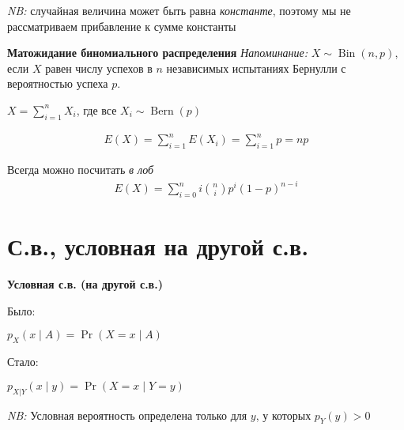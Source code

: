 \documentclass[12pt]{article}
\DeclareMathOperator{\Bin}{Bin}
\DeclareMathOperator{\Bern}{Bern}
\begin{document}
  \emph{NB:} случайная величина может быть равна \emph{константе}, поэтому мы не рассматриваем прибавление к сумме константы



  \textbf{Матожидание биномиального распределения}
  \emph{Напоминание:} $X \sim \Bin(n, p)$, если $X$ равен числу успехов в $n$ независимых испытаниях Бернулли с вероятностью успеха $p$.

   \vspace{1cm}

  $X = \sum_{i = 1}^n X_i$, где все $X_i \sim \Bern(p)$

  

  \begin{align*}
    E(X) = \sum_{i = 1}^n E(X_i) = \sum_{i = 1}^n p = np
  \end{align*}

  

  Всегда можно посчитать \emph{в лоб}
  \begin{align*}
    E(X) = \sum_{i = 0}^n i \binom{n}{i}p^i(1 - p)^{n - i}
  \end{align*}



\section{С.в., условная на другой с.в.}

  \textbf{Условная с.в. (на другой с.в.)}


      Было:

      $p_X(x \mid A) = \Pr(X = x \mid A)$

      Стало:

      $p_{X|Y}(x \mid y) = \Pr(X = x \mid Y = y)$

  

  \begin{center}
  \end{center}
  \emph{NB:} Условная вероятность определена только для $y$, у которых $p_Y(y) > 0$
\end{document}

